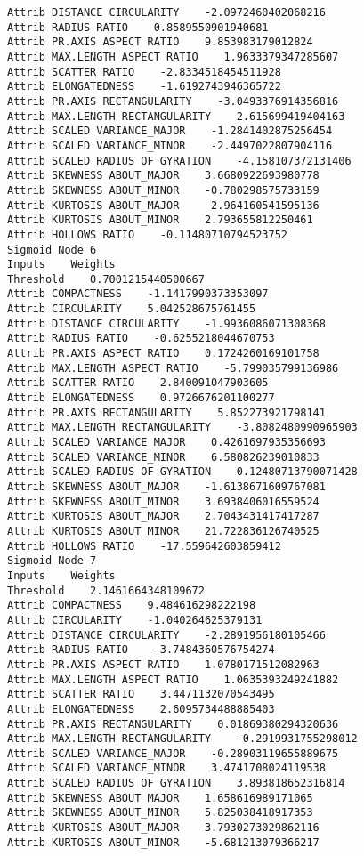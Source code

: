 \documentclass[
	article,			%
	11pt,				%
	oneside,			%
	a4paper,			%
	english,			%
	brazil,				%
	sumario=tradicional
	]{abntex2}
\begin{document}
\begin{lstlisting}
Attrib DISTANCE CIRCULARITY    -2.0972460402068216
Attrib RADIUS RATIO    0.8589550901940681
Attrib PR.AXIS ASPECT RATIO    9.853983179012824
Attrib MAX.LENGTH ASPECT RATIO    1.9633379347285607
Attrib SCATTER RATIO    -2.8334518454511928
Attrib ELONGATEDNESS    -1.6192743946365722
Attrib PR.AXIS RECTANGULARITY    -3.0493376914356816
Attrib MAX.LENGTH RECTANGULARITY    2.615699419404163
Attrib SCALED VARIANCE_MAJOR    -1.2841402875256454
Attrib SCALED VARIANCE_MINOR    -2.4497022807904116
Attrib SCALED RADIUS OF GYRATION    -4.158107372131406
Attrib SKEWNESS ABOUT_MAJOR    3.6680922693980778
Attrib SKEWNESS ABOUT_MINOR    -0.780298575733159
Attrib KURTOSIS ABOUT_MAJOR    -2.964160541595136
Attrib KURTOSIS ABOUT_MINOR    2.793655812250461
Attrib HOLLOWS RATIO    -0.11480710794523752
Sigmoid Node 6
Inputs    Weights
Threshold    0.7001215440500667
Attrib COMPACTNESS    -1.1417990373353097
Attrib CIRCULARITY    5.042528675761455
Attrib DISTANCE CIRCULARITY    -1.9936086071308368
Attrib RADIUS RATIO    -0.6255218044670753
Attrib PR.AXIS ASPECT RATIO    0.1724260169101758
Attrib MAX.LENGTH ASPECT RATIO    -5.799035799136986
Attrib SCATTER RATIO    2.840091047903605
Attrib ELONGATEDNESS    0.9726676201100277
Attrib PR.AXIS RECTANGULARITY    5.852273921798141
Attrib MAX.LENGTH RECTANGULARITY    -3.8082480990965903
Attrib SCALED VARIANCE_MAJOR    0.4261697935356693
Attrib SCALED VARIANCE_MINOR    6.580826239010833
Attrib SCALED RADIUS OF GYRATION    0.12480713790071428
Attrib SKEWNESS ABOUT_MAJOR    -1.6138671609767081
Attrib SKEWNESS ABOUT_MINOR    3.6938406016559524
Attrib KURTOSIS ABOUT_MAJOR    2.7043431417417287
Attrib KURTOSIS ABOUT_MINOR    21.722836126740525
Attrib HOLLOWS RATIO    -17.559642603859412
Sigmoid Node 7
Inputs    Weights
Threshold    2.1461664348109672
Attrib COMPACTNESS    9.484616298222198
Attrib CIRCULARITY    -1.040264625379131
Attrib DISTANCE CIRCULARITY    -2.2891956180105466
Attrib RADIUS RATIO    -3.7484360576754274
Attrib PR.AXIS ASPECT RATIO    1.0780171512082963
Attrib MAX.LENGTH ASPECT RATIO    1.0635393249241882
Attrib SCATTER RATIO    3.4471132070543495
Attrib ELONGATEDNESS    2.6095734488885403
Attrib PR.AXIS RECTANGULARITY    0.01869380294320636
Attrib MAX.LENGTH RECTANGULARITY    -0.2919931755298012
Attrib SCALED VARIANCE_MAJOR    -0.28903119655889675
Attrib SCALED VARIANCE_MINOR    3.4741708024119538
Attrib SCALED RADIUS OF GYRATION    3.893818652316814
Attrib SKEWNESS ABOUT_MAJOR    1.658616989171065
Attrib SKEWNESS ABOUT_MINOR    5.825038418917353
Attrib KURTOSIS ABOUT_MAJOR    3.7930273029862116
Attrib KURTOSIS ABOUT_MINOR    -5.681213079366217

\end{lstlisting}
\end{document}
